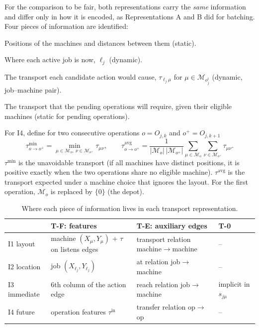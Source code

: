 \documentclass[11pt,a4paper]{article}
\newcommand{\Mset}{\mathcal{M}}
\newcommand{\loc}{\ell}
\begin{document}
For the comparison to be fair, both representations carry the \emph{same}
information and differ only in how it is encoded, as Representations A and B
did for batching. Four pieces of information are identified:
\begin{description}[style=nextline]
  \item[I1 -- Layout.] Positions of the machines and distances between them (static).
  \item[I2 -- Location.] Where each active job is now, $\loc_j$ (dynamic).
  \item[I3 -- Immediate transport.] The transport each candidate action would
    cause, $\tau_{\loc_j\mu}$ for $\mu\in\Mset_{o_j^t}$ (dynamic, job--machine pair).
  \item[I4 -- Future transport.] The transport that the pending operations will
    require, given their eligible machines (static for pending operations).
\end{description}
For I4, define for two consecutive operations $o=O_{j,k}$ and $o^+=O_{j,k+1}$
\begin{equation}
  \tau^{\min}_{o\to o^+}=\min_{\mu\in\Mset_o,\ \nu\in\Mset_{o^+}}\tau_{\mu\nu},\qquad
  \tau^{\mathrm{avg}}_{o\to o^+}=\frac{1}{|\Mset_o|\,|\Mset_{o^+}|}
  \sum_{\mu\in\Mset_o}\sum_{\nu\in\Mset_{o^+}}\tau_{\mu\nu}.
  \label{eq:tauexp}
\end{equation}
$\tau^{\min}$ is the unavoidable transport (if all machines have distinct
positions, it is positive exactly when the two operations share no eligible
machine). $\tau^{\mathrm{avg}}$ is the transport
expected under a machine choice that ignores the layout. For the first
operation, $\Mset_o$ is replaced by $\{0\}$ (the depot).

\begin{table}[h]
\centering
\caption{Where each piece of information lives in each transport representation.}
\label{tab:info}
\begin{tabular}{l p{4.3cm} p{4.3cm} l}
\toprule
 & T-F: features & T-E: auxiliary edges & T-0 \\
\midrule
I1 layout     & machine $(X_\mu,Y_\mu)$ + $\tau$ on \textsf{listens} edges & \textsf{transport} relation machine$\to$machine & -- \\
I2 location   & job $(X_{\loc_j},Y_{\loc_j})$ & \textsf{at} relation job$\to$machine & -- \\
I3 immediate  & 6th column of the action edge & \textsf{reach} relation job$\to$machine & implicit in $s_{j\mu}$ \\
I4 future     & operation features $\tau^{\mathrm{in}}$ & \textsf{transfer} relation op$\to$op & -- \\
\bottomrule
\end{tabular}
\end{table}
\end{document}
